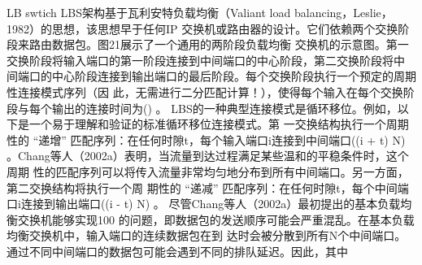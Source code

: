 LB swtich
LBS架构基于瓦利安特负载均衡（Valiant load balancing，Leslie，1982）的思想，该思想早于任何IP
交换机或路由器的设计。它们依赖两个交换阶段来路由数据包。图21展示了一个通用的两阶段负载均衡
交换机的示意图。第一交换阶段将输入端口的第一阶段连接到中间端口的中心阶段，第二交换阶段将中
间端口的中心阶段连接到输出端口的最后阶段。每个交换阶段执行一个预定的周期性连接模式序列（因
此，无需进行二分匹配计算！），使得每个输入在每个交换阶段与每个输出的连接时间为() 。
LBS的一种典型连接模式是循环移位。例如，以下是一个易于理解和验证的标准循环移位连接模式。第
一交换结构执行一个周期性的 “递增” 匹配序列：在任何时隙t，每个输入端口i连接到中间端口((i + t)
 N) 。Chang等人（2002a）表明，当流量到达过程满足某些温和的平稳条件时，这个周期
性的匹配序列可以将传入流量非常均匀地分布到所有中间端口。另一方面，第二交换结构将执行一个周
期性的 “递减” 匹配序列：在任何时隙t，每个中间端口i连接到输出端口((i - t)  N) 。
尽管Chang等人（2002a）最初提出的基本负载均衡交换机能够实现100%
的问题，即数据包的发送顺序可能会严重混乱。在基本负载均衡交换机中，输入端口的连续数据包在到
达时会被分散到所有N个中间端口。通过不同中间端口的数据包可能会遇到不同的排队延迟。因此，其中

